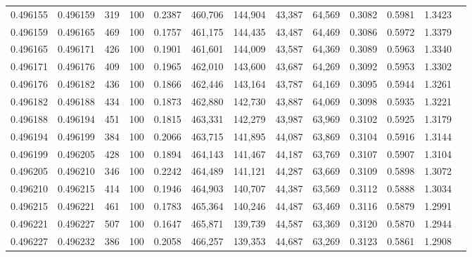 \begin{tabular}{rrrrrrrrrrrrr}
0.496155 & 0.496159 &   319 & 100 &                                     0.2387 & 460,706 & 144,904 &  43,387 &  64,569 & 0.3082 & 0.5981 & 1.3423 \\
0.496159 & 0.496165 &   469 & 100 &                                     0.1757 & 461,175 & 144,435 &  43,487 &  64,469 & 0.3086 & 0.5972 & 1.3379 \\
0.496165 & 0.496171 &   426 & 100 &                                     0.1901 & 461,601 & 144,009 &  43,587 &  64,369 & 0.3089 & 0.5963 & 1.3340 \\
0.496171 & 0.496176 &   409 & 100 &                                     0.1965 & 462,010 & 143,600 &  43,687 &  64,269 & 0.3092 & 0.5953 & 1.3302 \\
0.496176 & 0.496182 &   436 & 100 &                                     0.1866 & 462,446 & 143,164 &  43,787 &  64,169 & 0.3095 & 0.5944 & 1.3261 \\
0.496182 & 0.496188 &   434 & 100 &                                     0.1873 & 462,880 & 142,730 &  43,887 &  64,069 & 0.3098 & 0.5935 & 1.3221 \\
0.496188 & 0.496194 &   451 & 100 &                                     0.1815 & 463,331 & 142,279 &  43,987 &  63,969 & 0.3102 & 0.5925 & 1.3179 \\
0.496194 & 0.496199 &   384 & 100 &                                     0.2066 & 463,715 & 141,895 &  44,087 &  63,869 & 0.3104 & 0.5916 & 1.3144 \\
0.496199 & 0.496205 &   428 & 100 &                                     0.1894 & 464,143 & 141,467 &  44,187 &  63,769 & 0.3107 & 0.5907 & 1.3104 \\
0.496205 & 0.496210 &   346 & 100 &                                     0.2242 & 464,489 & 141,121 &  44,287 &  63,669 & 0.3109 & 0.5898 & 1.3072 \\
0.496210 & 0.496215 &   414 & 100 &                                     0.1946 & 464,903 & 140,707 &  44,387 &  63,569 & 0.3112 & 0.5888 & 1.3034 \\
0.496215 & 0.496221 &   461 & 100 &                                     0.1783 & 465,364 & 140,246 &  44,487 &  63,469 & 0.3116 & 0.5879 & 1.2991 \\
0.496221 & 0.496227 &   507 & 100 &                                     0.1647 & 465,871 & 139,739 &  44,587 &  63,369 & 0.3120 & 0.5870 & 1.2944 \\
0.496227 & 0.496232 &   386 & 100 &                                     0.2058 & 466,257 & 139,353 &  44,687 &  63,269 & 0.3123 & 0.5861 & 1.2908 \\

\end{tabular}
